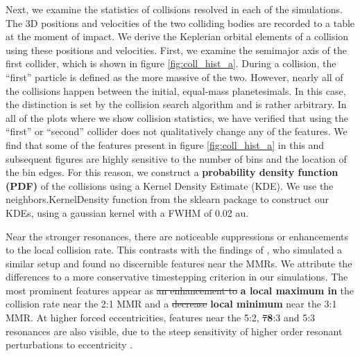 \documentclass[fleqn,usenatbib]{mnras}
\begin{document}
Next, we examine the statistics of collisions resolved in each of the simulations. The 3D positions and velocities of the two colliding bodies are 
recorded to a table at the moment of impact. We derive the Keplerian orbital elements of a collision using these positions and velocities. 
First, we examine the semimajor axis of the first collider, which is shown in figure \ref{fig:coll_hist_a}. During a collision, the ``first'' particle is defined 
as the more massive of the two. However, nearly all of the collisions happen between the initial, equal-mass planetesimals. In this case, the 
distinction is set by the collision search algorithm and is rather arbitrary. In all of the plots where we show collision statistics, we have verified that 
using the ``first'' or ``second'' collider does not qualitatively change any of the features. We find that some of the features present in figure 
\ref{fig:coll_hist_a} in this and subsequent figures are highly sensitive to the number of bins and the location of the bin edges. For this reason, we 
construct a \textbf{probability density function (PDF)} of the collisions using a Kernel Density Estimate (KDE). We use the {\sc neighbors.KernelDensity} function from the {\sc sklearn} 
\citep{scikit-learn} package to construct our KDEs, using a gaussian kernel with a FWHM of 0.02 au.

Near the stronger resonances, there are noticeable suppressions or enhancements to the local collision rate. This contrasts with the findings of 
\citet{2000Icar..143...45R}, who simulated a similar setup and found no discernible features near the MMRs. We attribute the differences to a more 
conservative timestepping criterion in our simulations. The most prominent features appear as \sout{an enhancement to} \textbf{a local maximum in} the collision rate near the 2:1 
MMR and a \sout{decrease} \textbf{local minimum} near the 3:1 MMR. At higher forced eccentricities, features near the 5:2, \sout{7}\textbf{8}:3 and 5:3 resonances are also visible, due to the 
steep sensitivity of higher order resonant perturbations to eccentricity \citep{1994PhyD...77..289M}.
\end{document}
